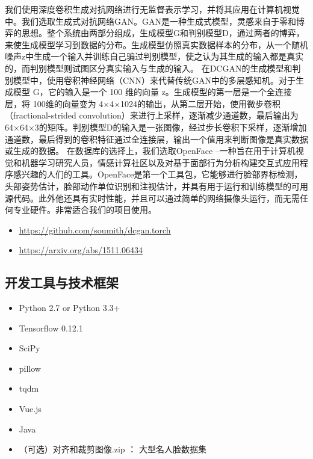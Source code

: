 \documentclass[hyperref, a4paper]{ctexart}
\providecommand{\tightlist}{%
  \setlength{\itemsep}{0pt}\setlength{\parskip}{0pt}}
\begin{document}
我们使用深度卷积生成对抗网络进行无监督表示学习，并将其应用在计算机视觉中。我们选取生成式对抗网络GAN。GAN是一种生成式模型，灵感来自于零和博弈的思想。整个系统由两部分组成，生成模型G和判别模型D，通过两者的博弈，来使生成模型学习到数据的分布。生成模型仿照真实数据样本的分布，从一个随机噪声z中生成一个输入并训练自己骗过判别模型，使之认为其生成的输入都是真实的，而判别模型则试图区分真实输入与生成的输入。
在DCGAN的生成模型和判别模型中，使用卷积神经网络（CNN）来代替传统GAN中的多层感知机。对于生成模型
G，它的输入是一个 100 维的向量 z。生成模型的第一层是一个全连接层，将
100维的向量变为
4×4×1024的输出，从第二层开始，使用微步卷积（fractional-strided
convolution）来进行上采样，逐渐减少通道数，最后输出为64×64×3的矩阵。判别模型D的输入是一张图像，经过步长卷积下采样，逐渐增加通道数，最后得到的卷积特征通过全连接层，输出一个值用来判断图像是真实数据或生成的数据。
在数据库的选择上，我们选取OpenFace
--一种旨在用于计算机视觉和机器学习研究人员，情感计算社区以及对基于面部行为分析构建交互式应用程序感兴趣的人们的工具。OpenFace是第一个工具包，它能够进行脸部界标检测，头部姿势估计，脸部动作单位识别和注视估计，并具有用于运行和训练模型的可用源代码。此外他还具有实时性能，并且可以通过简单的网络摄像头运行，而无需任何专业硬件。非常适合我们的项目使用。
\newline

\begin{itemize}
\tightlist
\item
  \url{https://github.com/soumith/dcgan.torch}
\item
  \url{https://arxiv.org/abs/1511.06434}
\end{itemize}

\hypertarget{ux5f00ux53d1ux5de5ux5177ux4e0eux6280ux672fux6846ux67b6}{%
\subsection{开发工具与技术框架}\label{ux5f00ux53d1ux5de5ux5177ux4e0eux6280ux672fux6846ux67b6}}

\begin{itemize}
\item
  Python 2.7 or Python 3.3+
\item
  Tensorflow 0.12.1
\item
  SciPy
\item
  pillow
\item
  tqdm
\item
  Vue.js
\item
  Java
\item
  （可选）对齐和裁剪图像.zip ： 大型名人脸数据集
\end{itemize}
\end{document}
